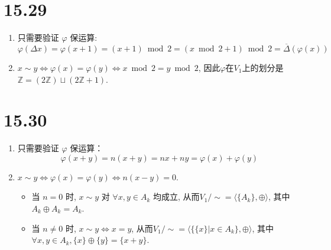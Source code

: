 \documentclass[8pt]{article}
\theoremstyle{compact}
\begin{document}
\section*{15.29}
\begin{enumerate}
	\item 只需要验证 $\varphi$ 保运算: $$\varphi(\Delta x) = \varphi(x + 1) = (x + 1) \bmod 2 = (x \bmod 2 + 1) \bmod 2 = \overline{\Delta}(\varphi(x))$$
	\item $x \sim y \Leftrightarrow \varphi(x) = \varphi(y) \Leftrightarrow x \bmod 2 = y \bmod 2$, 因此$\varphi$在$V_1$上的划分是 $\mathbb Z = (2\mathbb Z) \sqcup (2\mathbb Z + 1)$.
\end{enumerate}
\section*{15.30}
\begin{enumerate}
	\item 只需要验证 $\varphi$ 保运算： $$\varphi(x + y) = n(x + y) = nx + ny = \varphi(x) + \varphi(y)$$
	\item $x \sim y \Leftrightarrow \varphi(x) = \varphi(y) \Leftrightarrow n(x - y) = 0$.
	
	\begin{itemize}
		\item 当 $n = 0$ 时, $x \sim y$ 对 $\forall x, y \in A_k$ 均成立, 从而$V_1 / \sim = \langle \{A_k\}, \oplus \rangle$, 其中 $A_k \oplus A_k = A_k$.

		\item 当 $n \neq 0$ 时, $x \sim y \Leftrightarrow x = y$, 从而$V_1 / \sim = \langle \{\{x\} | x \in A_k\}, \oplus \rangle$, 其中$\forall x, y \in A_k, \{x\} \oplus \{y\} = \{x + y\}$.
	\end{itemize}
\end{enumerate}
\end{document}
